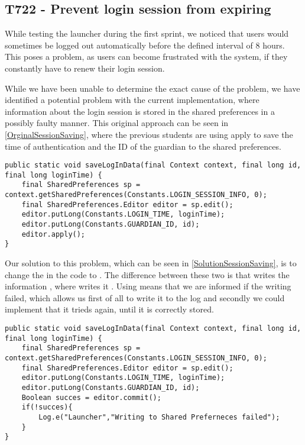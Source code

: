 \subsection{T722 - Prevent login session from expiring}\label{T722}
While testing the launcher during the first sprint, we noticed that users would
sometimes be logged out automatically before the defined interval of 8
hours. This poses a problem, as users can become frustrated with the system,
if they constantly have to renew their login session.\nl

While we have been unable to determine the exact cause of the problem, we have
identified a potential problem with the current implementation, where
information about the login session is stored in the shared preferences in a
possibly faulty manner. This original approach can be seen in
\autoref{OrginalSessionSaving}, where the previous students are using apply to
save the time of authentication and the ID of the guardian to the shared
preferences.\nl

\begin{minipage}[H]{\linewidth}
\begin{lstlisting}[caption = Original approach to saving login session, label =
OrginalSessionSaving]
public static void saveLogInData(final Context context, final long id, final long loginTime) {
    final SharedPreferences sp = context.getSharedPreferences(Constants.LOGIN_SESSION_INFO, 0);
    final SharedPreferences.Editor editor = sp.edit();
    editor.putLong(Constants.LOGIN_TIME, loginTime);
    editor.putLong(Constants.GUARDIAN_ID, id);
    editor.apply();
}
\end{lstlisting} 
\end{minipage}

Our solution to this problem, which can be seen in
\autoref{SolutionSessionSaving}, is to change the  in the code to
. The difference between these two is that  writes
the information , where 
writes it . Using  means that we are informed
if the writing failed, which allows us first of all to write it to the log and
secondly we could implement that it trieds again, until it is correctly
stored.\nl

\begin{minipage}[H]{\linewidth}
\begin{lstlisting}[caption = Our solution to saving login session, label
=SolutionSessionSaving ]
public static void saveLogInData(final Context context, final long id, final long loginTime) {
    final SharedPreferences sp = context.getSharedPreferences(Constants.LOGIN_SESSION_INFO, 0);
    final SharedPreferences.Editor editor = sp.edit();
    editor.putLong(Constants.LOGIN_TIME, loginTime);
    editor.putLong(Constants.GUARDIAN_ID, id);
    Boolean succes = editor.commit();
    if(!succes){
    	Log.e("Launcher","Writing to Shared Preferneces failed");
	}
} 
\end{lstlisting} 
\end{minipage}


